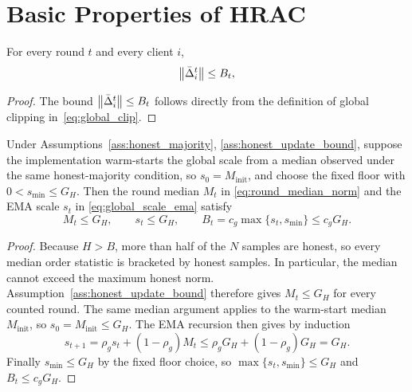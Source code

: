 \section{Basic Properties of HRAC}

\begin{lemma}
\label{lem:bounded}
For every round \(t\) and every client \(i\),
\begin{equation}
    \left\lVert \bar{\Delta}_i^t \right\rVert \le B_t,
    \label{eq:uniform_bound}
\end{equation}
\end{lemma}

\begin{proof}
The bound \(\left\lVert \bar{\Delta}_i^t \right\rVert \le B_t\) follows directly from the
definition of global clipping in~\eqref{eq:global_clip}.

\end{proof}

\begin{lemma}
\label{lem:median_cap_honest}
Under Assumptions~\ref{ass:honest_majority},
\ref{ass:honest_update_bound}, suppose the implementation warm-starts the
global scale from a median observed under the same honest-majority condition,
so \(s_0=M_{\mathrm{init}}\), and choose the fixed floor with
\(0<s_{\min}\le G_H\). Then the round median \(M_t\) in
\eqref{eq:round_median_norm} and the EMA scale \(s_t\) in
\eqref{eq:global_scale_ema} satisfy
\begin{equation}
    M_t\le G_H,
    \qquad
    s_t\le G_H,
    \qquad
    B_t=c_g\max\{s_t,s_{\min}\}\le c_gG_H.
    \label{eq:median_honest_bound}
\end{equation}
\end{lemma}

\begin{proof}
Because \(H>B\), more than half of the \(N\) samples are honest, so every
median order statistic is bracketed by honest samples. In particular, the
median cannot exceed the maximum honest norm. Assumption~\ref{ass:honest_update_bound}
therefore gives \(M_t\le G_H\) for every counted round. The same median
argument applies to the warm-start median \(M_{\mathrm{init}}\), so
\(s_0=M_{\mathrm{init}}\le G_H\). The EMA recursion then gives by induction
\[
    s_{t+1}
    =
    \rho_gs_t+(1-\rho_g)M_t
    \le
    \rho_gG_H+(1-\rho_g)G_H
    =
    G_H.
\]
Finally \(s_{\min}\le G_H\) by the fixed floor choice, so
\(\max\{s_t,s_{\min}\}\le G_H\) and \(B_t\le c_gG_H\).
\end{proof}

